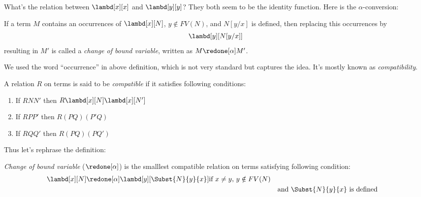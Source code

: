 \documentclass[../../../include/open-logic-section]{subfiles}
\begin{document}

What's the relation between $\lambd[x][x]$ and $\lambd[y][y]$? They
both seem to be the identity function. Here is the $\alpha$-conversion:

\begin{defn}
  If a term $M$ contains an occurrences of $\lambd[x][N]$, $y \notin
  FV(N)$, and $N[y/x]$ is defined, then replacing this occurrences
  by 
  \begin{equation*}
    \lambd[y][N[y/x]]
  \end{equation*}
  resulting in $M'$ is called a \emph{change of bound variable}, written
  as $M \redone[\alpha] M'$.
\end{defn}


We used the word ``occurrence'' in above definition, which is not very
standard but captures the idea. It's mostly known as
\emph{compatibility}. 
\begin{defn}
  A relation $R$ on terms is said to be \emph{compatible}
  if it satisfies following conditions:
  \begin{enumerate}
  \item If $R N N'$ then $R \lambd[x][N] \lambd[x][N']$
  \item If $R P P'$ then $R (PQ) (P'Q)$
  \item If $R Q Q'$ then $R (PQ) (PQ')$
  \end{enumerate}
\end{defn}

Thus let's rephrase the definition:
\begin{defn}
  \emph{Change of bound variable} ($\redone[\alpha]$) is 
  the smalllest compatible relation on terms satisfying following
  condition:
  \begin{align*}
    &\lambd[x][N] \redone[\alpha] \lambd[y][\Subst{N}{y}{x}] \text{if
      $x \neq y$, $y \notin FV(N)$} \\
    & &&\text{and $\Subst{N}{y}{x}$ is defined}
  \end{align*}
\end{defn}
\end{document}
